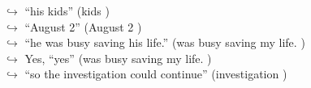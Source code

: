 \documentclass[11pt,a4paper, onecolumn]{article}
\begin{document}
\begin{figure}[t]
\begin{tcolorbox}[boxsep=0pt,left=5pt,right=0pt,top=2pt,colback = yellow!5]
\begin{dialogue}
\colorbox{pink!25}{$\hookrightarrow$}
{ ``his kids'' (kids ) }
\\
\colorbox{pink!25}{$\hookrightarrow$}
{ ``August 2'' (August 2 ) }
\\
\colorbox{pink!25}{$\hookrightarrow$}
{ ``he was busy saving his life.'' (was busy saving my life. ) }
\\
\colorbox{pink!25}{$\hookrightarrow$}
\colorbox{red!25}{Yes,}
{ ``yes'' (was busy saving my life. ) }
\\
\colorbox{pink!25}{$\hookrightarrow$}
{ ``so the investigation could continue'' (investigation ) }
\\
 \end{dialogue}\end{tcolorbox}\end{figure}
\end{document}
